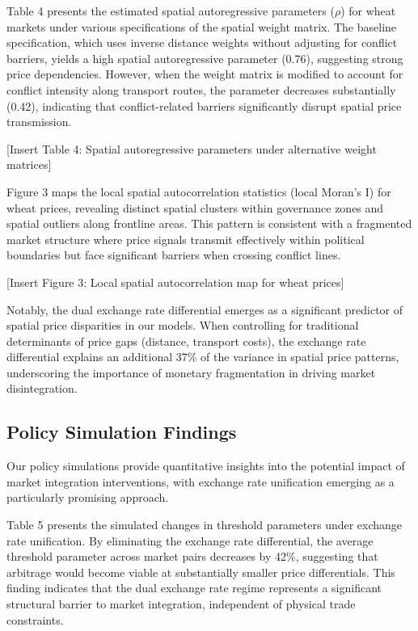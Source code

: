 Table 4 presents the estimated spatial autoregressive parameters ($\rho$) for wheat markets under various specifications of the spatial weight matrix. The baseline specification, which uses inverse distance weights without adjusting for conflict barriers, yields a high spatial autoregressive parameter (0.76), suggesting strong price dependencies. However, when the weight matrix is modified to account for conflict intensity along transport routes, the parameter decreases substantially (0.42), indicating that conflict-related barriers significantly disrupt spatial price transmission.

[Insert Table 4: Spatial autoregressive parameters under alternative weight matrices]

Figure 3 maps the local spatial autocorrelation statistics (local Moran's I) for wheat prices, revealing distinct spatial clusters within governance zones and spatial outliers along frontline areas. This pattern is consistent with a fragmented market structure where price signals transmit effectively within political boundaries but face significant barriers when crossing conflict lines.

[Insert Figure 3: Local spatial autocorrelation map for wheat prices]

Notably, the dual exchange rate differential emerges as a significant predictor of spatial price disparities in our models. When controlling for traditional determinants of price gaps (distance, transport costs), the exchange rate differential explains an additional 37\% of the variance in spatial price patterns, underscoring the importance of monetary fragmentation in driving market disintegration.

\subsection{Policy Simulation Findings}

Our policy simulations provide quantitative insights into the potential impact of market integration interventions, with exchange rate unification emerging as a particularly promising approach.

Table 5 presents the simulated changes in threshold parameters under exchange rate unification. By eliminating the exchange rate differential, the average threshold parameter across market pairs decreases by 42\%, suggesting that arbitrage would become viable at substantially smaller price differentials. This finding indicates that the dual exchange rate regime represents a significant structural barrier to market integration, independent of physical trade constraints.

